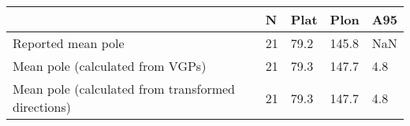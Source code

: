 \begin{tabular}{lllll}
\toprule
{} &   N &  Plat &   Plon &  A95 \\
\midrule
Reported mean pole                                 &  21 &  79.2 &  145.8 &  NaN \\
Mean pole (calculated from VGPs)                   &  21 &  79.3 &  147.7 &  4.8 \\
Mean pole (calculated from transformed directions) &  21 &  79.3 &  147.7 &  4.8 \\
\bottomrule
\end{tabular}
